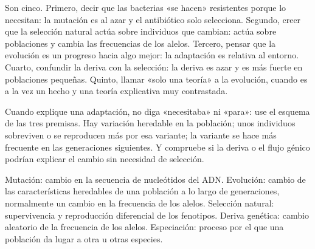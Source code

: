 \documentclass{book}
\begin{document}
Son cinco. Primero, decir que las bacterias «se hacen» resistentes porque lo necesitan: la mutación es al azar y el antibiótico solo selecciona. Segundo, creer que la selección natural actúa sobre individuos que cambian: actúa sobre poblaciones y cambia las frecuencias de los alelos. Tercero, pensar que la evolución es un progreso hacia algo mejor: la adaptación es relativa al entorno. Cuarto, confundir la deriva con la selección: la deriva es azar y es más fuerte en poblaciones pequeñas. Quinto, llamar «solo una teoría» a la evolución, cuando es a la vez un hecho y una teoría explicativa muy contrastada.


\begin{tcolorbox}[title={Consejo}, studiumtip, breakable]

Cuando explique una adaptación, no diga «necesitaba» ni «para»: use el esquema de las tres premisas. Hay variación heredable en la población; unos individuos sobreviven o se reproducen más por esa variante; la variante se hace más frecuente en las generaciones siguientes. Y compruebe si la deriva o el flujo génico podrían explicar el cambio sin necesidad de selección.

\end{tcolorbox}

\begin{tcolorbox}[title={Definición}, studiumdef, breakable]

Mutación: cambio en la secuencia de nucleótidos del ADN. Evolución: cambio de las características heredables de una población a lo largo de generaciones, normalmente un cambio en la frecuencia de los alelos. Selección natural: supervivencia y reproducción diferencial de los fenotipos. Deriva genética: cambio aleatorio de la frecuencia de los alelos. Especiación: proceso por el que una población da lugar a otra u otras especies.

\end{tcolorbox}
\end{document}

